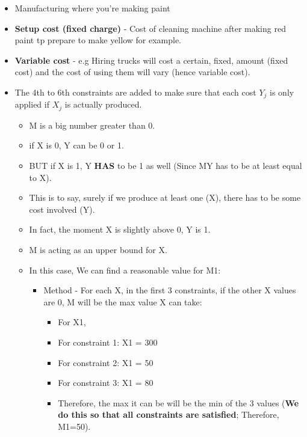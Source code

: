 \documentclass[12pt, a4paper]{article}
\begin{document}
\begin{itemize}
    \item Manufacturing where you're making paint
    \item \textbf{Setup cost (fixed charge)} - Cost of cleaning machine after making red paint tp prepare to make yellow for example.
    \item \textbf{Variable cost} - e.g Hiring trucks will cost a certain, fixed, amount (fixed cost) and the cost of using them will vary (hence variable cost).
    \item The 4th to 6th constraints are added to make sure that each cost $Y_j$ is only applied if $X_j$ is actually produced.
        \begin{itemize}
            \item M is a big number greater than 0.
            \item if X is 0, Y can be 0 or 1.
            \item BUT if X is 1, Y \textbf{HAS} to be 1 as well (Since MY has to be at least equal to X).
            \item This is to say, surely if we produce at least one (X), there has to be some cost involved (Y).
            \item In fact, the moment X is slightly above 0, Y is 1.
            \item M is acting as an upper bound for X.
            \item In this case, We can find a reasonable value for M1:
                \begin{itemize}
                    \item Method - For each X, in the first 3 constraints, if the other X values are 0, M will be the max value X can take:
                        \begin{itemize}
                            \item For X1,
                            \item For constraint 1: X1 = 300
                            \item For constraint 2: X1 = 50
                            \item For constraint 3: X1 = 80
                            \item Therefore, the max it can be will be the min of the 3 values (\textbf{We do this so that all constraints are satisfied}; Therefore, M1=50).
                        \end{itemize}
                \end{itemize}
        \end{itemize}
\end{itemize}
\end{document}
